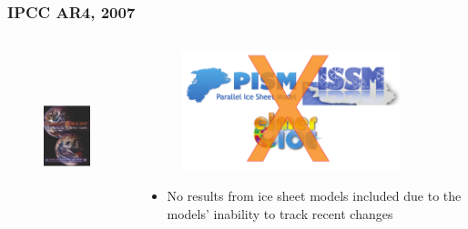 \documentclass[hide notes,intlimits]{beamer}
\begin{document}
\begin{frame}
  \frametitle{IPCC AR4, 2007}
  \begin{columns}[c]
    \begin{column}{.4\linewidth}
      \begin{figure}
        \includegraphics[height=5cm]{ar4-wg1}
      \end{figure}
    \end{column}
    \begin{column}{.5\linewidth}
      \begin{figure}
        \includegraphics[height=3.5cm]{no-ice-sheet-models}
      \end{figure}
      \begin{itemize}
      \item No results from ice sheet models included due to the models' inability to track recent changes
      \end{itemize}
    \end{column}
\end{columns}
\end{frame}
\end{document}
